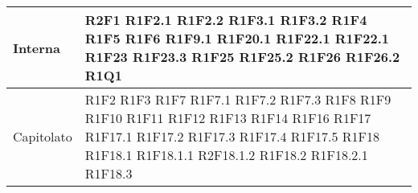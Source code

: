 \begin{center}
\begin{longtable}{|p{44mm}|p{22mm}|}
Interna &
R2F1 \newline
R1F2.1 \newline
R1F2.2 \newline
R1F3.1 \newline
R1F3.2 \newline
R1F4 \newline
R1F5 \newline
R1F6 \newline
R1F9.1 \newline
R1F20.1 \newline
R1F22.1 \newline
R1F22.1 \newline
R1F23 \newline
R1F23.3 \newline
R1F25 \newline
R1F25.2 \newline
R1F26 \newline
R1F26.2 \newline
R1Q1 \newline
\\
\hline
Capitolato &
R1F2 \newline
R1F3 \newline
R1F7 \newline
R1F7.1 \newline
R1F7.2 \newline
R1F7.3 \newline
R1F8 \newline
R1F9 \newline
R1F10 \newline
R1F11 \newline
R1F12 \newline
R1F13 \newline
R1F14 \newline
R1F16 \newline
R1F17 \newline
R1F17.1 \newline
R1F17.2 \newline
R1F17.3 \newline
R1F17.4 \newline
R1F17.5 \newline
R1F18 \newline
R1F18.1 \newline
R1F18.1.1 \newline
R2F18.1.2 \newline
R1F18.2 \newline
R1F18.2.1 \newline
R1F18.3 \newline

\end{longtable}
\end{center}
